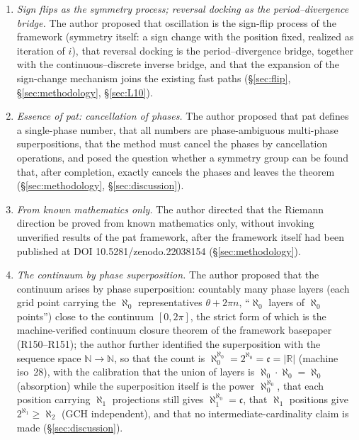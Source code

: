 \documentclass{article}
\begin{document}
\begin{enumerate}
and stable direction), since iterative approximation is itself
finite-reaching-infinite (\S\ref{sec:L11}, \S\ref{sec:growth}).
\item \emph{Sign flips as the symmetry process; reversal docking as the
period--divergence bridge.} The author proposed that oscillation is the
sign-flip process of the framework (symmetry itself: a sign change with the
position fixed, realized as iteration of $i$), that reversal docking is the
period--divergence bridge, together with the continuous--discrete inverse
bridge, and that the expansion of the sign-change mechanism joins the
existing fast paths (\S\ref{sec:flip}, \S\ref{sec:methodology},
\S\ref{sec:L10}).
\item \emph{Essence of pat: cancellation of phases.} The author proposed
that pat defines a single-phase number, that all numbers are
phase-ambiguous multi-phase superpositions, that the method must cancel the
phases by cancellation operations, and posed the question whether a symmetry
group can be found that, after completion, exactly cancels the phases and
leaves the theorem (\S\ref{sec:methodology}, \S\ref{sec:discussion}).
\item \emph{From known mathematics only.} The author directed that the
Riemann direction be proved from known mathematics only, without invoking
unverified results of the pat framework, after the framework itself had
been published at DOI 10.5281/zenodo.22038154 (\S\ref{sec:methodology}).
\item \emph{The continuum by phase superposition.} The author proposed that
the continuum arises by phase superposition: countably many phase layers
(each grid point carrying the $\aleph_0$ representatives $\theta+2\pi n$,
``$\aleph_0$ layers of $\aleph_0$ points'') close to the continuum
$[0,2\pi]$, the strict form of which is the machine-verified continuum
closure theorem of the framework basepaper \cite{patbase} (R150--R151);
the author further identified the superposition with the sequence space
$\mathbb{N}\to\mathbb{N}$, so that the count is
$\aleph_0^{\aleph_0}=2^{\aleph_0}=\mathfrak c=|\mathbb{R}|$ (machine
iso~28), with the calibration that the union of layers is
$\aleph_0\cdot\aleph_0=\aleph_0$ (absorption) while the superposition
itself is the power $\aleph_0^{\aleph_0}$, that each position carrying
$\aleph_1$ projections still gives $\aleph_1^{\aleph_0}=\mathfrak c$,
that $\aleph_1$ positions give $2^{\aleph_1}\ge\aleph_2$ (GCH
independent), and that no intermediate-cardinality claim is made
(\S\ref{sec:discussion}).
\end{enumerate}
\end{document}
